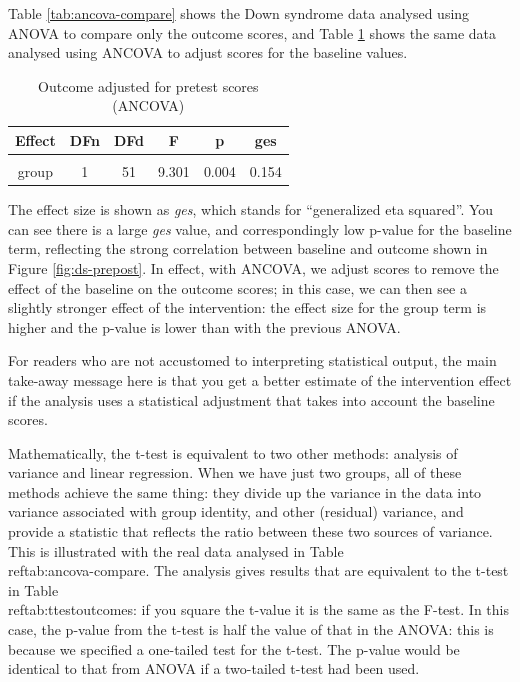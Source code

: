 \documentclass{krantz}
\begin{document}
Table \ref{tab:ancova-compare} shows the Down syndrome data analysed using ANOVA to compare only the outcome scores, and Table \ref{tab:ancova} shows the same data analysed using ANCOVA to adjust scores for the baseline values.

\begin{table}

\caption{\label{tab:ancova}Outcome adjusted for pretest scores (ANCOVA)}
\centering
\begin{tabular}[t]{cccccc}
\toprule
Effect & DFn & DFd & F & p & ges\\
\midrule
\cellcolor{gray!6}{baseline} & \cellcolor{gray!6}{1} & \cellcolor{gray!6}{51} & \cellcolor{gray!6}{94.313} & \cellcolor{gray!6}{0.000} & \cellcolor{gray!6}{0.649}\\
group & 1 & 51 & 9.301 & 0.004 & 0.154\\
\bottomrule
\end{tabular}
\end{table}

The effect size is shown as \emph{ges}, which stands for ``generalized eta squared''. You can see there is a large \emph{ges} value, and correspondingly low p-value for the baseline term, reflecting the strong correlation between baseline and outcome shown in Figure \ref{fig:ds-prepost}. In effect, with ANCOVA, we adjust scores to remove the effect of the baseline on the outcome scores; in this case, we can then see a slightly stronger effect of the intervention: the effect size for the group term is higher and the p-value is lower than with the previous ANOVA.

For readers who are not accustomed to interpreting statistical output, the main take-away message here is that you get a better estimate of the intervention effect if the analysis uses a statistical adjustment that takes into account the baseline scores.

\begin{tcolorbox}[colback=Black!5!lightgray,colframe=black!75!black,coltitle=white,title=Analysis of variance and linear regression]\label{box:ttestcomparison}
Mathematically, the t-test is equivalent to two other methods: analysis of variance and linear regression. When we have just two groups, all of these methods achieve the same thing: they divide up the variance in the data into variance associated with group identity, and other (residual) variance, and provide a statistic that reflects the ratio between these two sources of variance. This is illustrated with the real data analysed in Table \\ref{tab:ancova-compare}. The analysis gives results that are equivalent to the t-test in Table \\ref{tab:ttestoutcomes}: if you square the t-value it is the same as the F-test. In this case, the p-value from the t-test is half the value of that in the ANOVA: this is because we specified a one-tailed test for the t-test. The p-value would be identical to that from ANOVA if a two-tailed t-test had been used.\
\end{tcolorbox}
\end{document}

